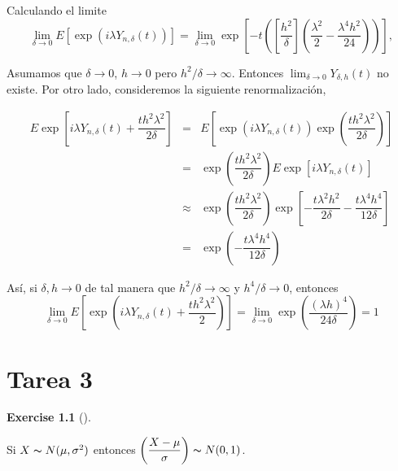 \documentclass[
  letterpaper,
  DIV=11,
  numbers=noendperiod]{scrreprt}
\theoremstyle{plain}
\theoremstyle{definition}
\newtheorem{exercise}{Exercise}[chapter]
\theoremstyle{remark}
\begin{document}
Calculando el limite \[
\lim_{\delta\to0}E\left[\exp\left(i\lambda Y_{n,\delta}\left(t\right)\right)\right]=\lim_{\delta\to0}\exp\left[-t\left(\left[\dfrac{h^{2}}{\delta}\right]\left(\dfrac{\lambda^{2}}{2}-\dfrac{\lambda^{4}h^{2}}{24}\right)\right)\right],
\]

Asumamos que \(\delta\to0\), \(h\to0\) pero \(h^{2}/\delta\to\infty\).
Entonces \(\lim_{\delta\to0} Y_{\delta, h}(t)\) no existe. Por otro
lado, consideremos la siguiente renormalización,

\[
\begin{eqnarray}
    E\exp\left[i\lambda Y_{n,\delta}\left(t\right)+\dfrac{th^{2}\lambda^{2}}{2\delta}\right] & = & E\left[\exp (i\lambda Y_{n,\delta}\left(t\right))\exp\left(\dfrac{th^{2}\lambda^{2}}{2\delta}\right)\right]\nonumber\\
    & = & \exp\left(\dfrac{th^{2}\lambda^{2}}{2\delta}\right)E\exp\left[ i\lambda Y_{n,\delta}\left(t\right)\right]\nonumber\\
    & \approx & \exp\left(\dfrac{th^{2}\lambda^{2}}{2\delta}\right)\exp\left[-\dfrac{t\lambda^{2} h^{2}}{2\delta}-\dfrac{t\lambda^{4} h^{4}}{12\delta}\right]\nonumber\\
    & = & \exp\left(-\dfrac{t\lambda^{4} h^{4}}{12\delta}\right)
\end{eqnarray}
\]

Así, si \(\delta,h\to0\) de tal manera que \(h^{2}/\delta\to\infty\) y
\(h^{4}/\delta\to0\), entonces \[
\lim_{\delta\to0}E\left[\exp\left(i\lambda Y_{n,\delta}\left(t\right)+\dfrac{th^{2}\lambda^{2}}{2}\right)\right]=\lim_{\delta\to0}\exp\left(\dfrac{\left(\lambda h\right)^{4}}{24\delta}\right)=1
\]


\hypertarget{tarea-3}{%
\chapter{Tarea 3}\label{tarea-3}}

\begin{exercise}[]\protect\hypertarget{exr-1}{}\label{exr-1}

Si \(X\thicksim N(\mu,\sigma^{2})\) entonces
\(\left(\dfrac{X-\mu}{\sigma}\right)\thicksim N(0,1)\).

\end{exercise}
\end{document}
